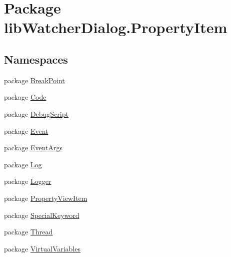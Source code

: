 \hypertarget{namespacelib_watcher_dialog_1_1_property_item}{\section{Package lib\+Watcher\+Dialog.\+Property\+Item}
\label{namespacelib_watcher_dialog_1_1_property_item}
}
\subsection*{Namespaces}
\begin{DoxyCompactItemize}
\item 
package \hyperlink{namespacelib_watcher_dialog_1_1_property_item_1_1_break_point}{Break\+Point}
\item 
package \hyperlink{namespacelib_watcher_dialog_1_1_property_item_1_1_code}{Code}
\item 
package \hyperlink{namespacelib_watcher_dialog_1_1_property_item_1_1_debug_script}{Debug\+Script}
\item 
package \hyperlink{namespacelib_watcher_dialog_1_1_property_item_1_1_event}{Event}
\item 
package \hyperlink{namespacelib_watcher_dialog_1_1_property_item_1_1_event_args}{Event\+Args}
\item 
package \hyperlink{namespacelib_watcher_dialog_1_1_property_item_1_1_log}{Log}
\item 
package \hyperlink{namespacelib_watcher_dialog_1_1_property_item_1_1_logger}{Logger}
\item 
package \hyperlink{namespacelib_watcher_dialog_1_1_property_item_1_1_property_view_item}{Property\+View\+Item}
\item 
package \hyperlink{namespacelib_watcher_dialog_1_1_property_item_1_1_special_keyword}{Special\+Keyword}
\item 
package \hyperlink{namespacelib_watcher_dialog_1_1_property_item_1_1_thread}{Thread}
\item 
package \hyperlink{namespacelib_watcher_dialog_1_1_property_item_1_1_virtual_variables}{Virtual\+Variables}
\end{DoxyCompactItemize}
